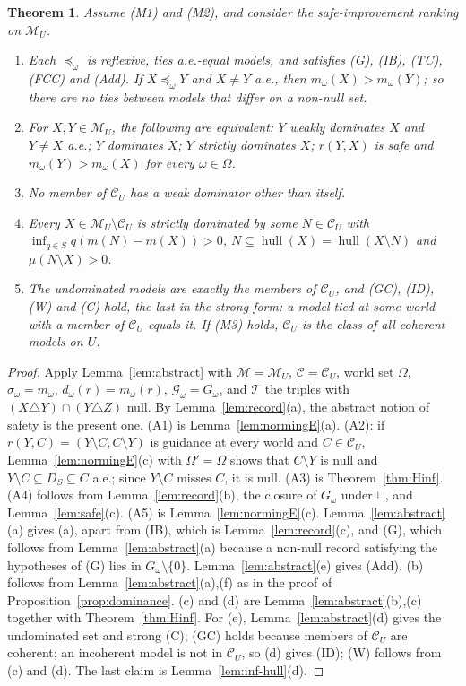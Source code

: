 \documentclass[11pt]{article}
\newcommand{\M}{\mathcal{M}}
\newcommand{\CC}{\mathcal{C}}
\newcommand{\hull}{\operatorname{hull}}
\theoremstyle{plain}
\newtheorem{theorem}{Theorem}[section]
\theoremstyle{definition}
\theoremstyle{remark}
\begin{document}
\begin{theorem}\label{thm:inf-main}
Assume (M1) and (M2), and consider the safe-improvement ranking on $\M_U$.
\begin{enumerate}[label=(\alph*)]
  \item Each $\preceq_\omega$ is reflexive, ties a.e.-equal models, and satisfies (G),
  (IB), (TC), (FCC) and (Add). If $X\preceq_\omega Y$ and $X\ne Y$ a.e., then
  $m_\omega(X)>m_\omega(Y)$; so there are no ties between models that differ on a
  non-null set.
  \item For $X,Y\in\M_U$, the following are equivalent: $Y$ weakly dominates $X$ and $Y\ne
  X$ a.e.; $Y$ dominates $X$; $Y$ strictly dominates $X$; $r(Y,X)$ is safe and
  $m_\omega(Y)>m_\omega(X)$ for every $\omega\in\Omega$.
  \item No member of $\CC_U$ has a weak dominator other than itself.
  \item Every $X\in\M_U\setminus\CC_U$ is strictly dominated by some $N\in\CC_U$ with
  $\inf_{q\in S}q(m(N)-m(X))>0$, $N\subseteq\hull(X)=\hull(X\setminus N)$ and
  $\mu(N\setminus X)>0$.
  \item The undominated models are exactly the members of $\CC_U$, and (GC), (ID), (W)
  and (C) hold, the last in the strong form: a model tied at some world with a member of
  $\CC_U$ equals it. If (M3) holds, $\CC_U$ is the class of all coherent models on $U$.
\end{enumerate}
\end{theorem}

\begin{proof}
Apply Lemma~\ref{lem:abstract} with $\M=\M_U$, $\CC=\CC_U$, world set $\Omega$,
$\sigma_\omega=m_\omega$, $d_\omega(r)=m_\omega(r)$, $\mathcal G_\omega=G_\omega$, and
$\mathcal T$ the triples with $(X\triangle Y)\cap(Y\triangle Z)$ null. By
Lemma~\ref{lem:record}(a), the abstract notion of safety is the present one. (A1) is
Lemma~\ref{lem:normingE}(a). (A2): if $r(Y,C)=(Y\setminus C,C\setminus Y)$ is guidance at
every world and $C\in\CC_U$, Lemma~\ref{lem:normingE}(c) with $\Omega'=\Omega$ shows that
$C\setminus Y$ is null and $Y\setminus C\subseteq D_S\subseteq C$ a.e.; since $Y\setminus C$
misses $C$, it is null. (A3) is Theorem~\ref{thm:Hinf}. (A4) follows from
Lemma~\ref{lem:record}(b), the closure of $G_\omega$ under $\sqcup$, and
Lemma~\ref{lem:safe}(c). (A5) is Lemma~\ref{lem:normingE}(c). Lemma~\ref{lem:abstract}(a)
gives (a), apart from (IB), which is Lemma~\ref{lem:record}(c), and (G), which follows from
Lemma~\ref{lem:abstract}(a) because a non-null record satisfying the hypotheses of (G) lies
in $G_\omega\setminus\{0\}$. Lemma~\ref{lem:abstract}(e) gives (Add). (b) follows from
Lemma~\ref{lem:abstract}(a),(f) as in the proof of Proposition~\ref{prop:dominance}. (c)
and (d) are Lemma~\ref{lem:abstract}(b),(c) together with Theorem~\ref{thm:Hinf}. For (e),
Lemma~\ref{lem:abstract}(d) gives the undominated set and strong (C); (GC) holds because
members of $\CC_U$ are coherent; an incoherent model is not in $\CC_U$, so (d) gives (ID);
(W) follows from (c) and (d). The last claim is Lemma~\ref{lem:inf-hull}(d).
\end{proof}
\end{document}
